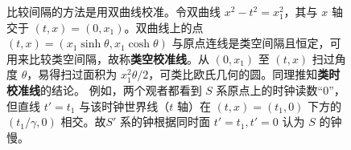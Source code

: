 \newpage
\begin{figure}[!h]
    \centering
        \quad
    \caption{\small 比较间隔的方法是用双曲线校准。令双曲线 $x^2-t^2=x_1^2$，其与 $x$ 轴交于 $\left(t,x\right)=(0,x_1)$。双曲线上的点 $(t,x)=(x_1\sinh\theta, x_1\cosh\theta)$ 与原点连线是类空间隔且恒定，可用来比较类空间隔，故称\textbf{类空校准线}。从 $(0,x_1)$ 至 $(t,x)$ 扫过角度 $\theta$，易得扫过面积为 $x_1^2\theta/2$，可类比欧氏几何的圆。同理推知\textbf{类时校准线}的结论。
    例如，两个观者都看到 $S$ 系原点上的时钟读数“0”，但直线 $t'=t_1$ 与该时钟世界线（$t$ 轴）在 $\left(t,x\right)=(t_1,0)$ 下方的 $(t_1/\gamma,0)$ 相交。故$S'$ 系的钟根据同时面 $t'=t_1,t'=0$ 认为 $S$ 的钟慢。}
\end{figure}
